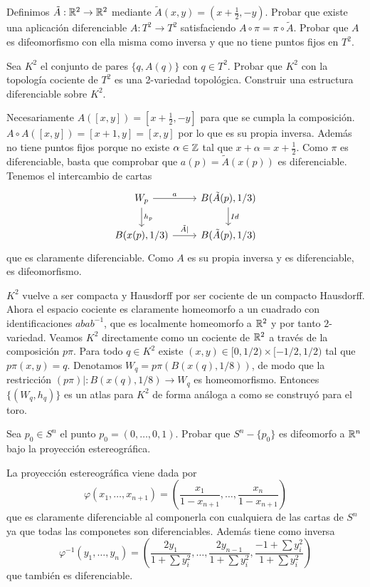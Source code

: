\documentclass[twoside]{article}
\begin{document}
\begin{ejercicio}{8.5}
Definimos $\tilde{A}:\mathbb{R}^2\to\mathbb{R}^2$ mediante $\tilde{A}(x,y)=(x+\frac{1}{2}, -y)$. Probar que existe una aplicación diferenciable $A:T^2\to T^2$ satisfaciendo $A\circ\pi =\pi\circ \tilde{A}$. Probar que $A$ es difeomorfismo con ella misma como inversa y que no tiene puntos fijos en $T^2$. 

Sea $K^2$ el conjunto de pares $\{q,A(q)\}$ con $q\in T^2$. Probar que $K^2$ con la topología cociente de $T^2$ es una 2-variedad topológica. Construir una estructura diferenciable sobre $K^2$.
\end{ejercicio}
\begin{solucion}
Necesariamente $A([x,y])=[x+\frac{1}{2}, -y]$ para que se cumpla la composición. $A\circ A([x,y])=[x+1,y]=[x,y]$ por lo que es su propia inversa. Además no tiene puntos fijos porque no existe $\alpha\in\mathbb{Z}$ tal que $x+\alpha=x+\frac{1}{2}$. Como $\pi$ es diferenciable, basta que comprobar que $a(p)=\tilde{A}(x(p))$ es diferenciable. Tenemos el intercambio de cartas
\[
\begin{tikzcd}
W_p\arrow[r, "a"]\arrow[d, "h_p"] & B(\tilde{A}(p),1/3)\arrow[d, "Id"]\\
B(x(p),1/3)\arrow[r, "\tilde{A}|"] & B(\tilde{A}(p), 1/3)
\end{tikzcd}
\]
que es claramente diferenciable. Como $A$ es su propia inversa y es diferenciable, es difeomorfismo.

$K^2$ vuelve a ser compacta y Hausdorff por ser cociente de un compacto Hausdorff. Ahora el espacio cociente es claramente homeomorfo a un cuadrado con identificaciones $abab^{-1}$, que es localmente homeomorfo a $\mathbb{R}^2$ y por tanto $2$-variedad. Veamos $K^2$ directamente como un cociente de $\mathbb{R}^2$ a través de la composición $p\pi$. Para todo $q\in K^2$ existe $(x,y)\in [0,1/2)\times [-1/2,1/2)$ tal que $p\pi(x,y)=q$. Denotamos $W_q=p\pi(B(x(q), 1/8))$, de modo que la restricción $(p\pi)|:B(x(q),1/8)\to W_q$ es homeomorfismo. Entonces $\{(W_q, h_q)\}$ es un atlas para $K^2$ de forma análoga a como se construyó para el toro.
\end{solucion}

\newpage

\begin{ejercicio}{8.6}
Sea $p_0\in S^n$  el punto $p_0=(0,\dots, 0,1)$. Probar que $S^n-\{p_0\}$ es difeomorfo a $\mathbb{R}^n$ bajo la proyección estereográfica. 
\end{ejercicio}
\begin{solucion}
\end{solucion}
La proyección estereográfica viene dada por
 \[
 φ (x_1,\dots,x_{n+1}) = \left(\frac{x_1}{1-x_{n+1}},\dots,\frac{x_n}{1-x_{n+1}}\right)
 \]
 que es claramente diferenciable al componerla con cualquiera de las cartas de $S^n$ ya que todas las componetes son diferenciables. Además tiene como inversa
 \[
 \varphi^{-1}(y_1,\dots, y_n)=\left(\frac{2y_1}{1+\sum y_i^2},\dots,\frac{2y_{n-1}}{1+\sum y_i^2}, \frac{-1+\sum y_i^2}{1+\sum y_i^2}\right)
 \]
que también es diferenciable. 
\end{document}
